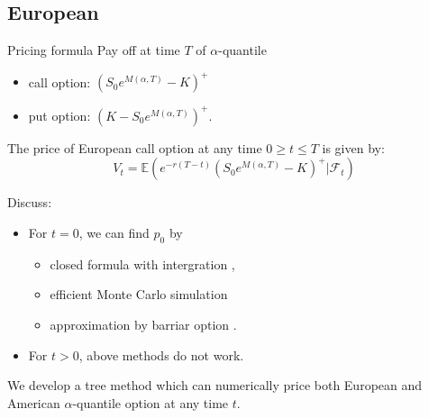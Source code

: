 \documentclass[cjk]{beamer}
\begin{document}
\subsection{European}
\begin{frame}{Pricing formula}
Pay off at time $T$ of $\alpha$-quantile
\begin{itemize}
\item call option: $(S_0 e^{M(\alpha,T)} - K)^+$
\item put option: $(K - S_0 e^{M(\alpha,T)})^+$.
\end{itemize}

The price of European call option at any time $0\geq t\leq T$ is given by:
\[
V_t = \mathbb{E}\left(e^{-r(T-t)}(S_0 e^{M(\alpha,T)} - K)^+|\mathcal{F}_t\right)
\]

Discuss:\\
\begin{itemize}
\item For $t=0$, we can find $p_0$ by 
  \begin{itemize}
  \item closed formula with intergration \cite{Dassios1995},
  \item  efficient Monte Carlo simulation \cite{Laura2001}
  \item approximation by barriar option \cite{Kwok2001}.
  \end{itemize}
\item For $t> 0$, above methods do not work.  
\end{itemize}

We develop a tree method which can numerically price both European and American 
$\alpha$-quantile option at any time $t$.  
\end{frame}
\end{document}
